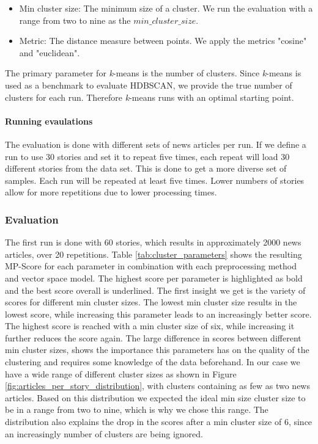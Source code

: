 \begin{itemize}
    \item Min cluster size: The minimum size of a cluster. We run the evaluation with a range from two to nine as the $min\_cluster\_size$. 
    \item Metric: The distance measure between points. We apply the metrics "cosine" and "euclidean". 
\end{itemize}

The primary parameter for \textit{k}-means is the number of clusters.
Since \textit{k}-means is used as a benchmark to evaluate HDBSCAN, we provide the true number of clusters for each run.
Therefore \textit{k}-means runs with an optimal starting point.

\paragraph{Running evaulations}
The evaluation is done with different sets of news articles per run.
If we define a run to use 30 stories and set it to repeat five times,
each repeat will load 30 different stories from the data set.
This is done to get a more diverse set of samples.
Each run will be repeated at least five times.
Lower numbers of stories allow for more repetitions due to lower processing times.

\subsubsection{Evaluation}

The first run is done with 60 stories, which results in approximately 2000 news articles, over 20 repetitions.
Table \ref{tab:cluster_parameters} shows the resulting MP-Score for each parameter in combination with each preprocessing method and vector space model.
The highest score per parameter is highlighted as bold and the best score overall is underlined.
The first insight we get is the variety of scores for different min cluster sizes.
The lowest min cluster size results in the lowest score,
while increasing this parameter leads to an increasingly better score.
The highest score is reached with a min cluster size of six, while increasing it further reduces the score again.
The large difference in scores between different min cluster sizes,
shows the importance this parameters has on the quality of the clustering and requires some knowledge of the data beforehand.
In our case we have a wide range of different cluster sizes as shown in Figure \ref{fig:articles_per_story_distribution},
with clusters containing as few as two news articles.
Based on this distribution we expected the ideal min size cluster size to be in a range from two to nine, which is why we chose this range.
The distribution also explains the drop in the scores after a min cluster size of 6, since an increasingly number of clusters are being ignored.

